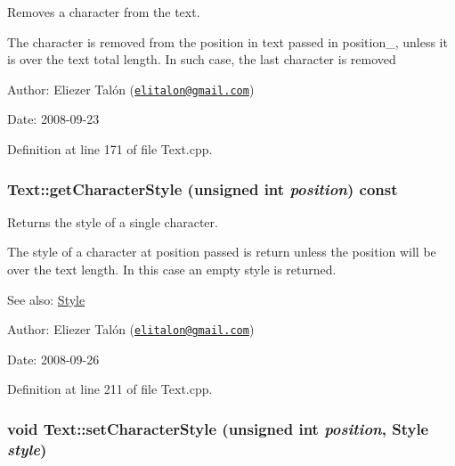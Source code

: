 Removes a character from the text. 

The character is removed from the position in text passed in position\_\-, unless it is over the text total length. In such case, the last character is removed

\begin{Desc}
\item[Author:]Eliezer Talón (\href{mailto:elitalon@gmail.com}{\tt elitalon@gmail.com}) \end{Desc}
\begin{Desc}
\item[Date:]2008-09-23 \end{Desc}


Definition at line 171 of file Text.cpp.\hypertarget{class_text_7fec452bd51b06b53fbb5abc9c335459}{
\subsubsection[getCharacterStyle]{ Text::getCharacterStyle (unsigned int {\em position}) const}}
\label{class_text_7fec452bd51b06b53fbb5abc9c335459}


Returns the style of a single character. 

The style of a character at position passed is return unless the position will be over the text length. In this case an empty style is returned.

\begin{Desc}
\item[See also:]\hyperlink{class_style}{Style}\end{Desc}
\begin{Desc}
\item[Author:]Eliezer Talón (\href{mailto:elitalon@gmail.com}{\tt elitalon@gmail.com}) \end{Desc}
\begin{Desc}
\item[Date:]2008-09-26 \end{Desc}


Definition at line 211 of file Text.cpp.\hypertarget{class_text_7cf2efca7fdd4d7b04292e373d5c2e5e}{
\subsubsection[setCharacterStyle]{\setlength{\rightskip}{0pt plus 5cm}void Text::setCharacterStyle (unsigned int {\em position}, \/  {\bf Style} {\em style})}}
\label{class_text_7cf2efca7fdd4d7b04292e373d5c2e5e}


